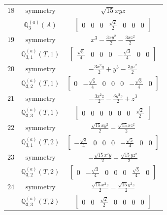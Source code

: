 \documentclass[fleqn,8pt,landscape]{jsarticle}
\begin{document}
\begin{longtable}{ccc}
$ 18 $ & $ \text{symmetry} $ & $ \sqrt{15} x y z $ \\
$  $ & $ \mathbb{Q}_{3}^{(a)}(A) $ & $ \begin{bmatrix} 0 & 0 & 0 & \frac{\sqrt{2}}{2} & 0 & 0 & 0 \end{bmatrix} $ \\ \hline
$ 19 $ & $ \text{symmetry} $ & $ x^{3} - \frac{3 x y^{2}}{2} - \frac{3 x z^{2}}{2} $ \\
$  $ & $ \mathbb{Q}_{3,1}^{(a)}(T,1) $ & $ \begin{bmatrix} \frac{\sqrt{5}}{4} & 0 & 0 & 0 & - \frac{\sqrt{3}}{4} & 0 & 0 \end{bmatrix} $ \\ \hline
$ 20 $ & $ \text{symmetry} $ & $ - \frac{3 x^{2} y}{2} + y^{3} - \frac{3 y z^{2}}{2} $ \\
$  $ & $ \mathbb{Q}_{3,2}^{(a)}(T,1) $ & $ \begin{bmatrix} 0 & - \frac{\sqrt{5}}{4} & 0 & 0 & 0 & - \frac{\sqrt{3}}{4} & 0 \end{bmatrix} $ \\ \hline
$ 21 $ & $ \text{symmetry} $ & $ - \frac{3 x^{2} z}{2} - \frac{3 y^{2} z}{2} + z^{3} $ \\
$  $ & $ \mathbb{Q}_{3,3}^{(a)}(T,1) $ & $ \begin{bmatrix} 0 & 0 & 0 & 0 & 0 & 0 & \frac{\sqrt{2}}{2} \end{bmatrix} $ \\ \hline
$ 22 $ & $ \text{symmetry} $ & $ \frac{\sqrt{15} x y^{2}}{2} - \frac{\sqrt{15} x z^{2}}{2} $ \\
$  $ & $ \mathbb{Q}_{3,1}^{(a)}(T,2) $ & $ \begin{bmatrix} - \frac{\sqrt{3}}{4} & 0 & 0 & 0 & - \frac{\sqrt{5}}{4} & 0 & 0 \end{bmatrix} $ \\ \hline
$ 23 $ & $ \text{symmetry} $ & $ - \frac{\sqrt{15} x^{2} y}{2} + \frac{\sqrt{15} y z^{2}}{2} $ \\
$  $ & $ \mathbb{Q}_{3,2}^{(a)}(T,2) $ & $ \begin{bmatrix} 0 & - \frac{\sqrt{3}}{4} & 0 & 0 & 0 & \frac{\sqrt{5}}{4} & 0 \end{bmatrix} $ \\ \hline
$ 24 $ & $ \text{symmetry} $ & $ \frac{\sqrt{15} x^{2} z}{2} - \frac{\sqrt{15} y^{2} z}{2} $ \\
$  $ & $ \mathbb{Q}_{3,3}^{(a)}(T,2) $ & $ \begin{bmatrix} 0 & 0 & \frac{\sqrt{2}}{2} & 0 & 0 & 0 & 0 \end{bmatrix} $ \\ \hline

\end{longtable}
\end{document}

